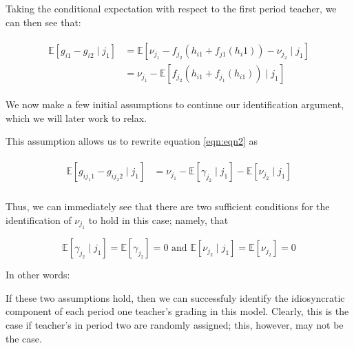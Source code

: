 \documentclass{article}
\begin{document}
Taking the conditional expectation with respect to the first period teacher, we can then see that:

\begin{align}
\begin{split}
	\label{eqn:eqn2}
	\mathbb{E}[g_{i1}-g_{i2} \mid j_1] & = \mathbb{E}[\nu_{j_1}-f_{j_2}(h_{i1}+f_{j1}(h_i1))-\nu_{j_2} \mid j_1]\\
	& = \nu_{j_1} - \mathbb{E}[f_{j_2}(h_{i1}+f_{j_1}(h_{i1})) \mid j_1]
\end{split}
\end{align}

We now make a few initial assumptions to continue our identification argument, which we will later work to relax.

\noindent{}

This assumption allows us to rewrite equation \ref{eqn:eqn2} as

\begin{align}
\begin{split}
	\label{eqn:eqn3}
	\mathbb{E}[g_{i j_{1} 1}-g_{i j_{2}2} \mid j_1] & = \nu_{j_1} - \mathbb{E}[\gamma_{j_2} \mid j_1] - \mathbb{E}[\nu_{j_2} \mid j_1] \\
\end{split}
\end{align}

Thus, we can immediately see that there are two sufficient conditions for the identification of $\nu_{j_1}$ to hold in this case; namely, that 

\[
	\mathbb{E}[\gamma_{j_2}\mid j_1] = \mathbb{E}[\gamma_{j_2}] = 0 \textrm{ and } \mathbb{E}[\nu_{j_2} \mid j_1] = \mathbb{E}[\nu_{j_2}] = 0
\]

In other words:

\noindent{}

If these two assumptions hold, then we can successfuly identify the idiosyncratic component of each period one teacher's grading in this model. Clearly, this is the case if teacher's in period two are randomly assigned; this, however, may not be the case. 
\end{document}
